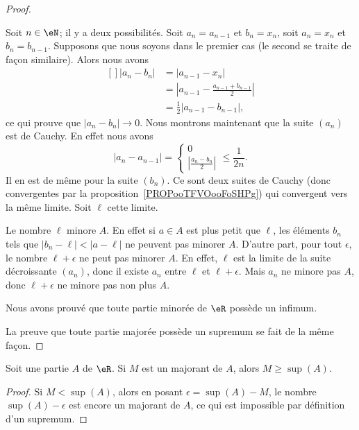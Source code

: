 \begin{proof}
\begin{subproof}
		Soit $n\in\eN$; il y a deux possibilités. Soit $a_n=a_{n-1}$ et $b_n=x_n$, soit $a_n=x_n$ et $b_n=b_{n-1}$. Supposons que nous soyons dans le premier cas (le second se traite de façon similaire). Alors nous avons
		\begin{equation}
			\begin{aligned}[]
				| a_n-b_n | & =| a_{n-1}-x_n |                                    \\
				            & =\left| a_{n-1}-\frac{ a_{n-1}+b_{n-1} }{2} \right| \\
				            & =\frac{ 1 }{2}| a_{n-1}-b_{n-1} |,
			\end{aligned}
		\end{equation}
		ce qui prouve que $| a_n-b_n |\to 0$. Nous montrons maintenant que la suite \( (a_n)\) est de Cauchy. En effet nous avons
		\begin{equation}
			| a_n-a_{n-1} |=\begin{cases}
				0 \\
				\left| \frac{ a_n -b_n}{ 2} \right|
			\end{cases}\leq \frac{1}{ 2n }.
		\end{equation}
		Il en est de même pour la suite \( (b_n)\). Ce sont deux suites de Cauchy (donc convergentes par la proposition~\ref{PROPooTFVOooFoSHPg}) qui convergent vers la même limite. Soit \( \ell\) cette limite.

		Le nombre $\ell$ minore $A$. En effet si $a\in A$ est plus petit que $\ell$, les éléments $b_n$ tels que $| b_n-\ell |<| a-\ell |$ ne peuvent pas minorer $A$. D'autre part, pour tout $\epsilon$, le nombre $\ell+\epsilon$ ne peut pas minorer $A$. En effet, $\ell$ est la limite de la suite décroissante $(a_n)$, donc il existe $a_n$ entre $\ell$ et $\ell+\epsilon$. Mais $a_n$ ne minore pas $A$, donc $\ell+\epsilon$ ne minore pas non plus $A$.

		Nous avons prouvé que toute partie minorée de $\eR$ possède un infimum.
	\end{subproof}

	La preuve que toute partie majorée possède un supremum se fait de la même façon.
\end{proof}

\begin{lemma}       \label{LEMooSSVKooDPhSkq}
	Soit une partie \( A\) de \( \eR\). Si \( M\) est un majorant de \( A\), alors \( M\geq \sup(A)\).
\end{lemma}

\begin{proof}
	Si \( M<\sup(A)\), alors en posant \( \epsilon=\sup(A)-M\), le nombre \( \sup(A)-\epsilon\) est encore un majorant de \( A\), ce qui est impossible par définition d'un supremum.
\end{proof}

